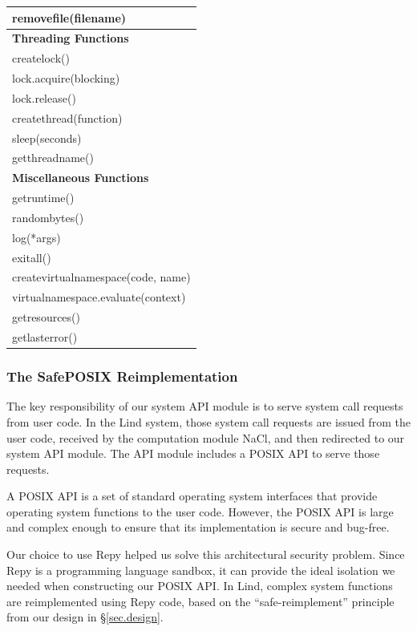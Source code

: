 \begin{table}
\begin{tabular}{|l|}
  \hline
  removefile(filename) \\
  \hline \hline
  \textbf{Threading Functions} \\
  \hline
  createlock() \\
  \hline
  lock.acquire(blocking) \\
  \hline
  lock.release() \\
  \hline
  createthread(function) \\
  \hline
  sleep(seconds) \\
  \hline
  getthreadname() \\
  \hline \hline
  \textbf{Miscellaneous Functions} \\
  \hline
  getruntime() \\
  \hline
  randombytes() \\
  \hline
  log(*args) \\
  \hline
  exitall() \\
  \hline
  createvirtualnamespace(code, name) \\
  \hline
  virtualnamespace.evaluate(context) \\
  \hline
  getresources() \\
  \hline
  getlasterror() \\
  \hline
\end{tabular}
\label{table:RepyKernel}
\end{table}

\subsubsection{The SafePOSIX Reimplementation}

The key responsibility of our system API module is to serve system call requests from user code. 
In the Lind system, those system call requests are issued from the user code, 
received by the computation module NaCl, and then redirected to our system API module. 
The API module includes a POSIX API to serve those requests. 

A POSIX API is a set of standard operating system interfaces that provide operating system functions 
to the user code. However, the POSIX API is large and complex enough to ensure that its implementation is secure and bug-free. 

Our choice to use Repy helped us solve this architectural security problem. 
Since Repy is a programming language sandbox, it can provide the ideal isolation 
we needed when constructing our POSIX API. In Lind, 
complex system functions are reimplemented using Repy code, 
based on the ``safe-reimplement'' principle from our design in \S{\ref{sec.design}}.

